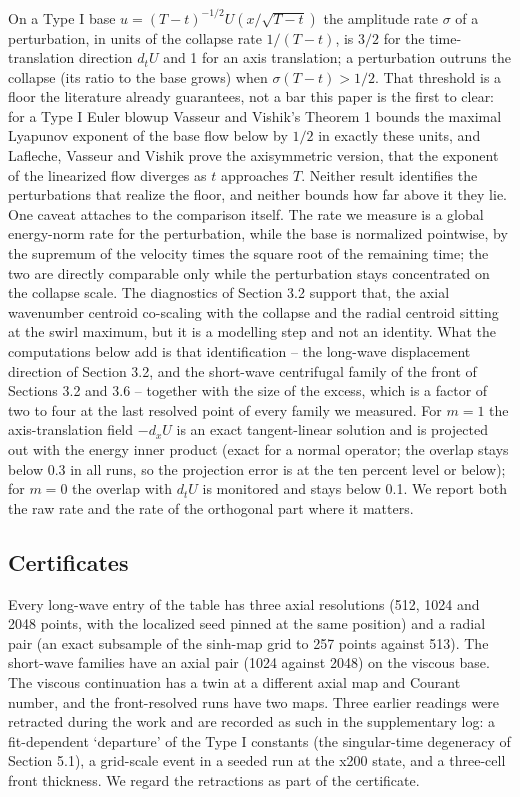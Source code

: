 \documentclass[11pt]{article}
\begin{document}
On a Type I base $u = (T - t)^{-1/2} U(x / \sqrt{T - t})$ the amplitude rate $\sigma$ of a perturbation, in units of the collapse rate $1/(T - t)$, is $3/2$ for the time-translation direction $d_t U$ and 1 for an axis translation; a perturbation outruns the collapse (its ratio to the base grows) when $\sigma (T - t) > 1/2$. That threshold is a floor the literature already guarantees, not a bar this paper is the first to clear: for a Type I Euler blowup Vasseur and Vishik's Theorem 1 \cite{VV20} bounds the maximal Lyapunov exponent of the base flow below by $1/2$ in exactly these units, and Lafleche, Vasseur and Vishik \cite{LVV21} prove the axisymmetric version, that the exponent of the linearized flow diverges as $t$ approaches $T$. Neither result identifies the perturbations that realize the floor, and neither bounds how far above it they lie. One caveat attaches to the comparison itself. The rate we measure is a global energy-norm rate for the perturbation, while the base is normalized pointwise, by the supremum of the velocity times the square root of the remaining time; the two are directly comparable only while the perturbation stays concentrated on the collapse scale. The diagnostics of Section 3.2 support that, the axial wavenumber centroid co-scaling with the collapse and the radial centroid sitting at the swirl maximum, but it is a modelling step and not an identity. What the computations below add is that identification -- the long-wave displacement direction of Section 3.2, and the short-wave centrifugal family of the front of Sections 3.2 and 3.6 -- together with the size of the excess, which is a factor of two to four at the last resolved point of every family we measured. For $m = 1$ the axis-translation field $-d_x U$ is an exact tangent-linear solution and is projected out with the energy inner product (exact for a normal operator; the overlap stays below 0.3 in all runs, so the projection error is at the ten percent level or below); for $m = 0$ the overlap with $d_t U$ is monitored and stays below 0.1. We report both the raw rate and the rate of the orthogonal part where it matters.

\subsection{Certificates}

Every long-wave entry of the table has three axial resolutions (512, 1024 and 2048 points, with the localized seed pinned at the same position) and a radial pair (an exact subsample of the sinh-map grid to 257 points against 513). The short-wave families have an axial pair (1024 against 2048) on the viscous base. The viscous continuation has a twin at a different axial map and Courant number, and the front-resolved runs have two maps. Three earlier readings were retracted during the work and are recorded as such in the supplementary log: a fit-dependent `departure' of the Type I constants (the singular-time degeneracy of Section 5.1), a grid-scale event in a seeded run at the x200 state, and a three-cell front thickness. We regard the retractions as part of the certificate.
\end{document}

